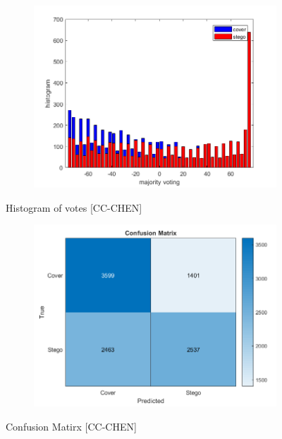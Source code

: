 \begin{figure}[H]
    \centering
    \begin{subfigure}[b]{0.5\textwidth}
        \includegraphics[width=\textwidth]{img/histochen.png}
    \end{subfigure}
    \caption{Histogram of votes [CC-CHEN]}
\begin{table}[H]
    \centering
        \begin{subfigure}[b]{0.5\textwidth}
            \includegraphics[width=\textwidth]{img/confusionChen.png}
        \end{subfigure}
    \caption{Confusion Matirx [CC-CHEN]}
\end{table}
\end{figure}
